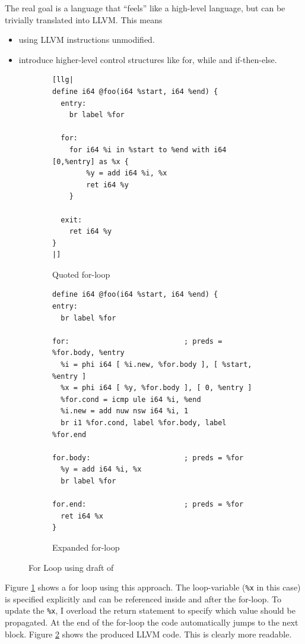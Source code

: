 \documentclass[a4paper,bibliography=totocnumbered,parskip,headsepline]{scrbook}
\begin{document}
The real goal is a language that ``feels'' like a high-level language, but can be trivially translated into LLVM.
This means
\begin{itemize}[noitemsep]
 \item using LLVM instructions unmodified.
 \item introduce higher-level control structures like for, while and if-then-else.
\end{itemize}

\begin{figure}
\begin{subfigure}{\textwidth}
\begin{lstlisting}
[llg|
define i64 @foo(i64 %start, i64 %end) {
  entry:
    br label %for

  for:
    for i64 %i in %start to %end with i64 [0,%entry] as %x {
        %y = add i64 %i, %x
        ret i64 %y
    }

  exit:
    ret i64 %y
}
|]
\end{lstlisting}
\caption{Quoted for-loop}
\label{fig:forquote1}
\end{subfigure}

\begin{subfigure}{\textwidth}
\begin{lstlisting}
define i64 @foo(i64 %start, i64 %end) {
entry:
  br label %for

for:                           ; preds = %for.body, %entry
  %i = phi i64 [ %i.new, %for.body ], [ %start, %entry ]
  %x = phi i64 [ %y, %for.body ], [ 0, %entry ]
  %for.cond = icmp ule i64 %i, %end
  %i.new = add nuw nsw i64 %i, 1
  br i1 %for.cond, label %for.body, label %for.end

for.body:                      ; preds = %for
  %y = add i64 %i, %x
  br label %for

for.end:                       ; preds = %for
  ret i64 %x
}
\end{lstlisting}
\caption{Expanded for-loop}
\label{fig:forquote2}
\end{subfigure}
\caption{For Loop using draft of }
\label{fig:forquote}
\end{figure}

Figure \ref{fig:forquote1} shows a for loop using this approach.
The loop-variable (\lstinline!%x! in this case) is specified explicitly and can be referenced inside and after the for-loop.
To update the \lstinline!%x!, I overload the return statement to specify which value should be propagated.
At the end of the for-loop the code automatically jumps to the next block.
Figure \ref{fig:forquote2} shows the produced LLVM code.
This is clearly more readable.
\end{document}
